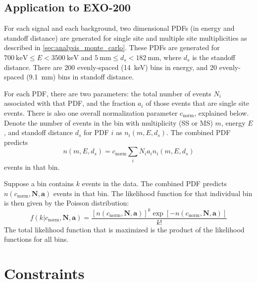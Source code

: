 \documentclass[herrin-thesis.tex]{subfiles}
\begin{document}
\subsection{Application to EXO-200}

For each signal and each background, two dimensional PDFs (in energy and standoff distance) are generated for single site and multiple site multiplicities as described in \cref{sec:analysis_monte_carlo}. These PDFs are generated for \(\SI{700}{\keV} \leq E < \SI{3500}{\keV}\) and \(\SI{5}{\mm} \leq d_s < \SI{182}{\mm}\), where \(d_s\) is the standoff distance. There are 200 evenly-spaced (\SI{14}{\keV}) bins in energy, and 20 evenly-spaced (\SI{9.1}{\mm}) bins in standoff distance.

For each PDF, there are two parameters: the total number of events \(N_i\) associated with that PDF, and the fraction \(a_i\) of those events that are single site events. There is also one overall normalization parameter \(c_\text{norm}\), explained below. Denote the number of events in the bin with multiplicity (SS or MS) \(m\), energy \(E\), and standoff distance \(d_s\) for PDF \(i\) as \(n_i(m, E, d_s)\). The combined PDF predicts
\begin{equation}
n(m, E, d_s) = c_\text{norm}\sum_i N_i a_i n_i(m, E, d_s)
\label{eq:analysis_sum_pdf}
\end{equation}
events in that bin.

Suppose a bin contains \(k\) events in the data. The combined PDF predicts \(n(c_\text{norm}, \mathbf{N}, \mathbf{a})\) events in that bin. The likelihood function for that individual bin is then given by the Poisson distribution:
\begin{equation}
f(k|c_\text{norm}, \mathbf{N}, \mathbf{a}) = \frac{[n(c_\text{norm}, \mathbf{N}, \mathbf{a})]^k \exp[-n(c_\text{norm}, \mathbf{N}, \mathbf{a})]}{k!}
\end{equation}
The total likelihood function that is maximized is the product of the likelihood functions for all bins.

\section{Constraints}
\end{document}
